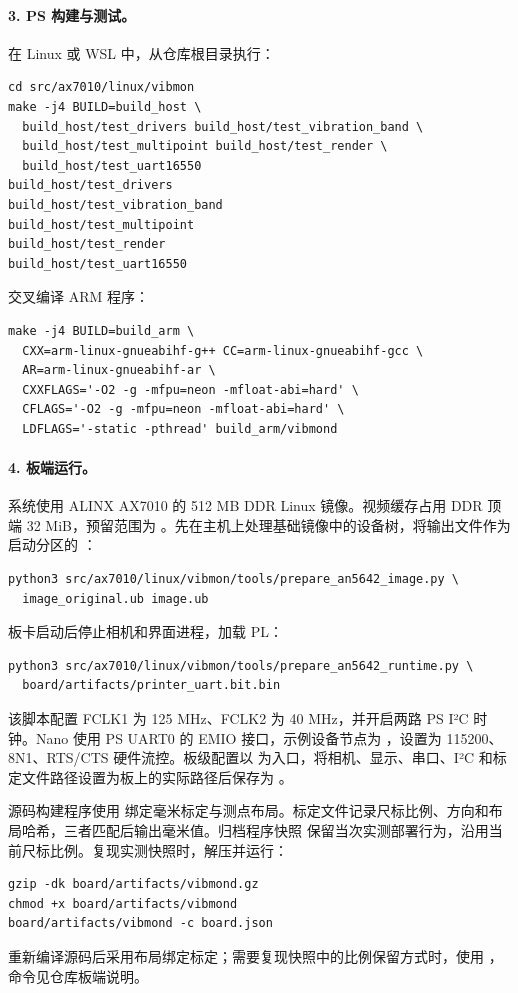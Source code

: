 \paragraph{3. PS 构建与测试。}在 Linux 或 WSL 中，从仓库根目录执行：
\begin{lstlisting}
cd src/ax7010/linux/vibmon
make -j4 BUILD=build_host \
  build_host/test_drivers build_host/test_vibration_band \
  build_host/test_multipoint build_host/test_render \
  build_host/test_uart16550
build_host/test_drivers
build_host/test_vibration_band
build_host/test_multipoint
build_host/test_render
build_host/test_uart16550
\end{lstlisting}
交叉编译 ARM 程序：
\begin{lstlisting}
make -j4 BUILD=build_arm \
  CXX=arm-linux-gnueabihf-g++ CC=arm-linux-gnueabihf-gcc \
  AR=arm-linux-gnueabihf-ar \
  CXXFLAGS='-O2 -g -mfpu=neon -mfloat-abi=hard' \
  CFLAGS='-O2 -g -mfpu=neon -mfloat-abi=hard' \
  LDFLAGS='-static -pthread' build_arm/vibmond
\end{lstlisting}

\paragraph{4. 板端运行。}系统使用 ALINX AX7010 的 512 MB DDR Linux 镜像。视频缓存占用 DDR 顶端 32 MiB，预留范围为 。先在主机上处理基础镜像中的设备树，将输出文件作为启动分区的 ：
\begin{lstlisting}
python3 src/ax7010/linux/vibmon/tools/prepare_an5642_image.py \
  image_original.ub image.ub
\end{lstlisting}
板卡启动后停止相机和界面进程，加载 PL：
\begin{lstlisting}
python3 src/ax7010/linux/vibmon/tools/prepare_an5642_runtime.py \
  board/artifacts/printer_uart.bit.bin
\end{lstlisting}
该脚本配置 FCLK1 为 125 MHz、FCLK2 为 40 MHz，并开启两路 PS I²C 时钟。Nano 使用 PS UART0 的 EMIO 接口，示例设备节点为 \code{/dev/ttyPS1}，设置为 115200、8N1、RTS/CTS 硬件流控。板级配置以  为入口，将相机、显示、串口、I²C 和标定文件路径设置为板上的实际路径后保存为 。

源码构建程序使用 \code{layout\_hash} 绑定毫米标定与测点布局。标定文件记录尺标比例、方向和布局哈希，三者匹配后输出毫米值。归档程序快照  保留当次实测部署行为，沿用当前尺标比例。复现实测快照时，解压并运行：
\begin{lstlisting}
gzip -dk board/artifacts/vibmond.gz
chmod +x board/artifacts/vibmond
board/artifacts/vibmond -c board.json
\end{lstlisting}
重新编译源码后采用布局绑定标定；需要复现快照中的比例保留方式时，使用 ，命令见仓库板端说明。

